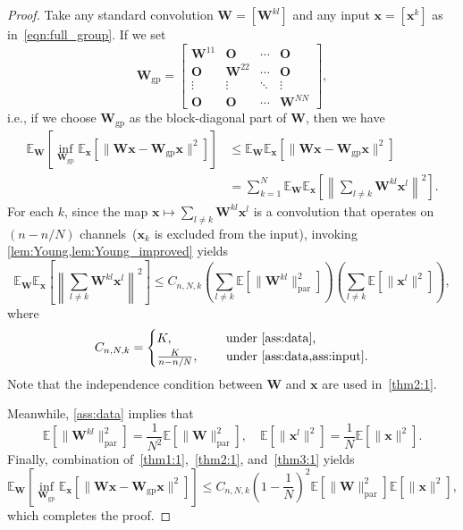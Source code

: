 \documentclass[preprint,12pt,authoryear]{elsarticle}
\numberwithin{equation}{section}
\theoremstyle{remark}
\newcommand\bO{\mathbf{O}}
\newcommand\bW{\mathbf{W}}
\newcommand\bx{\mathbf{x}}
\newcommand\bbE{\mathbb{E}}
\newcommand\gp{\mathrm{gp}}
\newcommand\param{\mathrm{par}}
\begin{document}
\begin{proof}
Take any standard convolution $\bW = [\bW^{kl}]$ and any input $\bx = [\bx^k]$ as in~\eqref{eqn:full_group}.
If we set
\begin{equation*}
    \bW_{\gp} = \begin{bmatrix} \bW^{11} & \bO & \cdots & \bO \\
        \bO & \bW^{22} & \cdots & \bO \\
        \vdots & \vdots & \ddots & \vdots \\
        \bO & \bO & \cdots & \bW^{NN} \end{bmatrix},
\end{equation*}
i.e., if we choose $\bW_{\gp}$ as the block-diagonal part of $\bW$, then we have
\begin{align}
    \label{thm1:1}
    \bbE_{\bW} \left[ \inf_{\bW_{\gp}} \bbE_{\bx} \left[ \| \bW \bx - \bW_{\gp} \bx \|^2 \right] \right]
    &\leq \bbE_{\bW} \bbE_{\bx} \left[ \| \bW \bx - \bW_{\gp} \bx \|^2 \right] \nonumber \\
    &= \sum_{k=1}^N \bbE_{\bW} \bbE_{\bx} \left[ \left\| \sum_{l \neq k} \bW^{kl} \bx^l \right\|^2 \right].
\end{align}
For each $k$, since the map $\bx \mapsto \sum_{l \neq k} \bW^{kl} \bx^l$ is a convolution that operates on $(n - n/N)$ channels~($\bx_k$ is excluded from the input), invoking \cref{lem:Young,lem:Young_improved} yields
\begin{equation}
    \label{thm2:1}
    \bbE_{\bW} \bbE_{\bx} \left[ \left\| \sum_{l \neq k} \bW^{kl} \bx^l \right\|^2 \right] \leq C_{n,N,k} \left( \sum_{l \neq k} \bbE \left[ \| \bW^{kl} \|_{\param}^2 \right] \right) \left( \sum_{l \neq k} \bbE \left[ \| \bx^l \|^2 \right] \right),
\end{equation}
where
\begin{equation}
\label{C}
C_{n,N,k} = \begin{cases}
K, & \quad \text{ under \cref{ass:data},} \\
\frac{K}{n-n/N}, & \quad \text{ under \cref{ass:data,ass:input}.}
\end{cases}
\end{equation}
Note that the independence condition between $\bW$ and $\bx$ are used in~\eqref{thm2:1}.

Meanwhile, \cref{ass:data} implies that
\begin{equation}
    \label{thm3:1}
    \bbE \left[ \| \bW^{kl} \|_{\param}^2 \right] = \frac{1}{N^2} \bbE \left[ \| \bW \|_{\param}^2 \right], \quad
    \bbE \left[ \| \bx^l \|^2 \right] = \frac{1}{N} \bbE \left[ \| \bx \|^2 \right].
\end{equation}
Finally, combination of~\eqref{thm1:1},~\eqref{thm2:1}, and~\eqref{thm3:1} yields
\begin{equation*}
    \bbE_{\bW} \left[ \inf_{\bW_{\gp}} \bbE_{\bx} \left[ \| \bW \bx - \bW_{\gp} \bx \|^2 \right] \right]
    \leq C_{n,N,k} \left( 1 - \frac{1}{N} \right)^2 \bbE \left[ \| \bW \|_{\param}^2 \right] \bbE \left[ \| \bx \|^2 \right],
\end{equation*}
which completes the proof.
\end{proof}
\end{document}
